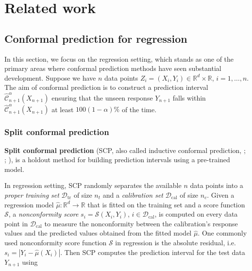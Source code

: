 \documentclass[
  11pt,
  a4paper,
]{article}
\theoremstyle{plain}
\theoremstyle{plain}
\theoremstyle{remark}
\begin{document}
\section{Related work}\label{sec-review}

\subsection{Conformal prediction for regression}\label{sec-review_reg}

In this section, we focus on the regression setting, which stands as one
of the primary areas where conformal prediction methods have seen
substantial development. Suppose we have \(n\) data points
\(Z_i = (X_i, Y_i) \in \mathbb{R}^d \times \mathbb{R}\),
\(i=1,\ldots,n\). The aim of conformal prediction is to construct a
prediction interval
\(\hat{\mathcal{C}}_{n+1}^{\alpha}\left(X_{n+1}\right)\) ensuring that
the unseen response \(Y_{n+1}\) falls within
\(\hat{\mathcal{C}}_{n+1}^{\alpha}\left(X_{n+1}\right)\) at least
\(100(1-\alpha)\%\) of the time.

\subsubsection{Split conformal
prediction}\label{split-conformal-prediction}

\textbf{Split conformal prediction} (SCP, also called inductive
conformal prediction, \textcite{papadopoulos2002}; \textcite{vovk2005};
\textcite{lei2018}), is a holdout method for building prediction
intervals using a pre-trained model.

In regression setting, SCP randomly separates the available \(n\) data
points into a \emph{proper training set} \(\mathcal{D}_{\text{tr}}\) of
size \(n_t\) and a \emph{calibration set} \(\mathcal{D}_{\text{cal}}\)
of size \(n_c\). Given a regression model
\(\hat{\mu}: \mathbb{R}^d \rightarrow \mathbb{R}\) that is fitted on the
training set and a score function \(\mathcal{S}\), a \emph{nonconformity
score} \(s_i = \mathcal{S}\left(X_i, Y_i\right)\),
\(i\in\mathcal{D}_{\text{cal}}\), is computed on every data point in
\(\mathcal{D}_{\text{cal}}\) to measure the nonconformity between the
calibration's response values and the predicted values obtained from the
fitted model \(\hat{\mu}\). One commonly used nonconformity score
function \(\mathcal{S}\) in regression is the absolute residual,
i.e.~\(s_i = |Y_i - \hat{\mu}(X_i)|\). Then SCP computes the prediction
interval for the test data \(Y_{n+1}\) using
\end{document}
